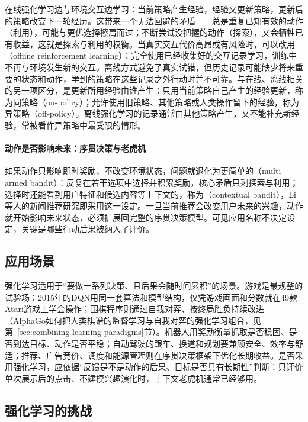 在线强化学习边与环境交互边学习：当前策略产生经验，经验又更新策略，更新后的策略改变下一轮经历。这带来一个无法回避的矛盾——总是重复已知有效的动作（利用），可能与更优选择擦肩而过；不断尝试没把握的动作（探索），又会牺牲已有收益，这就是探索与利用的权衡。当真实交互代价高昂或有风险时，可以改用（offline reinforcement learning）：完全使用已经收集好的交互记录学习，训练中不再与环境发生新的交互。离线方式避免了真实试错，但历史记录可能缺少将来重要的状态和动作，学到的策略在这些记录之外行动时并不可靠。与在线、离线相关的另一项区分，是更新所用经验由谁产生：只用当前策略自己产生的经验更新，称为同策略（on-policy）；允许使用旧策略、其他策略或人类操作留下的经验，称为异策略（off-policy）。离线强化学习的记录通常由其他策略产生，又不能补充新经验，常被看作异策略中最受限的情形。

\paragraph{动作是否影响未来：序贯决策与老虎机}

如果动作只影响即时奖励、不改变环境状态，问题就退化为更简单的（multi-armed bandit）：反复在若干选项中选择并积累奖励，核心矛盾只剩探索与利用；选择时还能看到用户特征和候选内容等上下文的，称为（contextual bandit），Li等人的新闻推荐研究即采用这一设定。一旦当前推荐会改变用户未来的兴趣，动作就开始影响未来状态，必须扩展回完整的序贯决策模型。可见应用名称不决定设定，关键是哪些行动后果被纳入了评价。

\subsection{应用场景}

强化学习适用于“要做一系列决策、且后果会随时间累积”的场景。游戏是最规整的试验场：2015年的DQN用同一套算法和模型结构，仅凭游戏画面和分数就在49款Atari游戏上学会操作；围棋程序则通过自我对弈、按终局胜负持续改进（AlphaGo如何把人类棋谱的监督学习与自我对弈的强化学习组合，见第~\ref{sec:combining-learning-paradigms}节）。机器人用奖励衡量抓取是否稳固、是否到达目标、动作是否平稳；自动驾驶的跟车、换道和规划要兼顾安全、效率与舒适；推荐、广告竞价、调度和能源管理则在序贯决策框架下优化长期收益。是否采用强化学习，应依据“反馈是不是动作的后果、目标是否具有长期性”判断：只评价单次展示后的点击、不建模兴趣演化时，上下文老虎机通常已经够用。

\subsection{强化学习的挑战}

